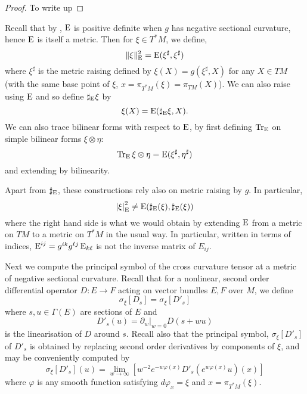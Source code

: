 \documentclass[a4paper, 12pt]{amsart}
\begin{document}
\begin{proof}
{\color{red} To write up}
\end{proof}

Recall that by , \(\operatorname{E}\) is positive definite when \(g\) has negative sectional curvature, hence \(\operatorname{E}\) is itself a metric. Then for \(\xi \in T^{\ast} M\), we define,
\[
\|\xi\|_{\operatorname{E}}^2 = \operatorname{E}(\xi^{\sharp}, \xi^{\sharp})
\]
where \(\xi^{\sharp}\) is the metric raising defined by \(\xi(X) = g(\xi^{\sharp}, X)\) for any \(X \in TM\) (with the same base point of \(\xi\), \(x = \pi_{T^{\ast}M} (\xi) = \pi_{TM} (X)\)). We can also raise using \(\operatorname{E}\) and so define \(\sharp_{\operatorname{E}} \xi\) by
\[
\xi(X) = \operatorname{E}(\sharp_{\operatorname{E}} \xi, X).
\]
We can also trace bilinear forms with respect to \(\operatorname{E}\), by first defining \(\operatorname{Tr}_{\operatorname{E}}\) on simple bilinear forms \(\xi \otimes \eta\):
\[
\operatorname{Tr}_{\operatorname{E}} \xi \otimes \eta = \operatorname{E}(\xi^{\sharp}, \eta^{\sharp})
\]
and extending by bilinearity.

\begin{rem}
Apart from \(\sharp_{\operatorname{E}}\), these constructions rely also on metric raising by \(g\). In particular,
\[
\left\lvert{\xi}\right\rvert^2_{\operatorname{E}} \ne \operatorname{E}(\sharp_{\operatorname{E}} (\xi), \sharp_{\operatorname{E}} (\xi))
\]
where the right hand side is what we would obtain by extending \(\operatorname{E}\) from a metric on \(TM\) to a metric on \(T^{\ast} M\) in the usual way. In particular, written in terms of indices, \(\operatorname{E}^{ij} = g^{ik}g^{\ell j} \operatorname{E}_{k\ell}\) is not the inverse matrix of \(E_{ij}\).
\end{rem}

Next we compute the principal symbol of the cross curvature tensor at a metric of negative sectional curvature. Recall that for a nonlinear, second order differential operator \(D : E \to F\) acting on vector bundles \(E, F\) over \(M\), we define
\begin{equation}
\label{eq:symbol}
\sigma_{\xi} [D_s] = \sigma_{\xi} [D'_s]
\end{equation}
where \(s, u \in \Gamma(E)\) are sections of \(E\) and
\[
D'_s (u) = \partial_w|_{w=0} D(s + w u)
\]
is the linearisation of \(D\) around \(s\). Recall also that the principal symbol, \(\sigma_{\xi} [D'_s]\) of \(D'_s\) is obtained by replacing second order derivatives by components of \(\xi\), and may be conveniently computed by
\begin{equation}
\label{eq:symbol_compute}
\sigma_{\xi} [D'_s] (u) = \lim_{w\to \infty} \left[w^{-2} e^{-w\varphi(x)} D'_s (e^{w\varphi(x)} u)(x)\right]
\end{equation}
where \(\varphi\) is any smooth function satisfying \(d\varphi_x = \xi\) and \(x = \pi_{T^{\ast}M} (\xi)\).
\end{document}
